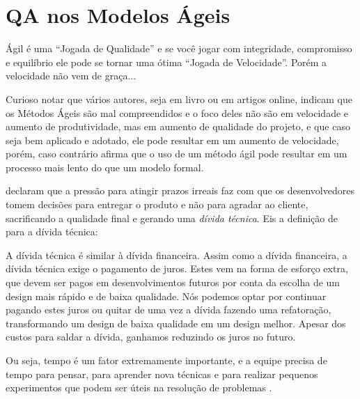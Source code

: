 \documentclass[
	12pt,				%
	openright,			%
	oneside,			%
	a4paper,			%
	english,			%
	brazil,				%
	]{abntex2}
\begin{document}
\section{QA nos Modelos Ágeis}
\begin{citacao}
Ágil é uma ``Jogada de Qualidade'' e se você jogar com integridade, compromisso e equilíbrio ele pode se tornar uma ótima ``Jogada de Velocidade''. Porém a velocidade não vem de graça...\cite{galen2014}
\end{citacao}

Curioso notar que vários autores, seja em livro ou em artigos online, indicam que os Métodos Ágeis são mal compreendidos e o foco deles não são em velocidade e aumento de produtividade, mas em aumento de qualidade do projeto, e que caso seja bem aplicado e adotado, ele pode resultar em um aumento de velocidade, porém, caso contrário  afirma que o uso de um método ágil pode resultar em um processo mais lento do que um modelo formal.

 declaram que a pressão para atingir prazos irreais faz com que os desenvolvedores tomem decisões para entregar o produto e não para agradar ao cliente, sacrificando a qualidade final e gerando uma \emph{dívida técnica}. Eis a definição de  para a dívida técnica:
\begin{citacao}
A dívida técnica é similar à dívida financeira. Assim como a dívida financeira, a dívida técnica exige o pagamento de juros. Estes vem na forma de esforço extra, que devem ser pagos em desenvolvimentos futuros por conta da escolha de um design mais rápido e de baixa qualidade. Nós podemos optar por continuar pagando estes juros ou quitar de uma vez a dívida fazendo uma refatoração, transformando um design de baixa qualidade em um design melhor. Apesar dos custos para saldar a dívida, ganhamos reduzindo os juros no futuro.
\end{citacao}

Ou seja, tempo é um fator extremamente importante, e a equipe precisa de tempo para pensar, para aprender nova técnicas e para realizar pequenos experimentos que podem ser úteis na resolução de problemas \cite{crispin2014}.
\end{document}
